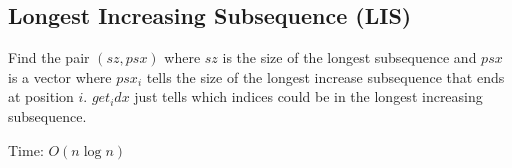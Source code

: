 \subsection{Longest Increasing Subsequence (LIS)}


Find the pair $(sz, psx)$ where $sz$ is the size of the longest subsequence and $psx$ is a vector where $psx_i$ tells the size of the longest increase subsequence that ends at position $i$. $get_idx$ just tells which indices could be in the longest increasing subsequence.

Time: $O(n\log{n})$

